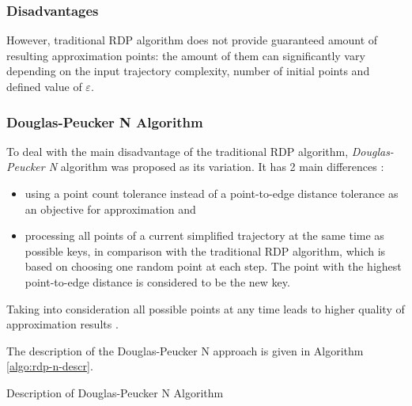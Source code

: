 \bigbreak

\subsubsection{Disadvantages}

However, traditional RDP algorithm does not provide guaranteed amount of resulting approximation points: the amount of them can significantly vary depending on the input trajectory complexity, number of initial points and defined value of $\varepsilon$.

\subsubsection{Douglas-Peucker N Algorithm}

To deal with the main disadvantage of the traditional RDP algorithm, \textit{Douglas-Peucker N} algorithm was proposed as its variation. It has 2 main differences \cite{online:rdp_algo_var}: 

\begin{itemize}
	\setlength\itemsep{0em}
	\item using a point count tolerance instead of a point-to-edge distance tolerance as an objective for approximation and 
	\item processing all points of a current simplified trajectory at the same time as possible keys, in comparison with the traditional RDP algorithm, which is based on choosing one random point at each step. The point with the highest point-to-edge distance is considered to be the new key.
\end{itemize}

Taking into consideration all possible points at any time leads to higher quality of approximation results \cite{online:rdp_algo_var}.

The description of the Douglas-Peucker N approach is given in Algorithm \ref{algo:rdp-n-descr}.

\begin{algorithm}[!htb]
	\caption{Description of Douglas-Peucker N Algorithm}
	\label{algo:rdp-n-descr}
	\SetAlgoLined
	
\end{algorithm}

